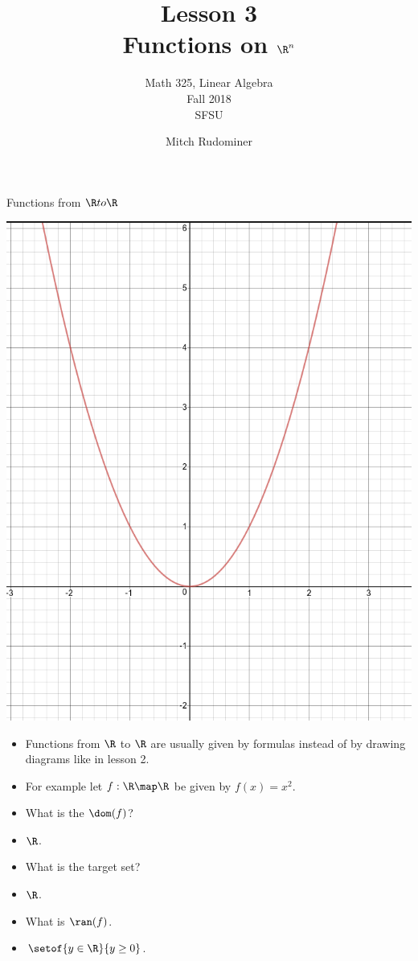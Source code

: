 \documentclass{beamer}
\title{Lesson 3 \\ Functions on $\R^n$}
\subtitle{Math 325, Linear Algebra \\ Fall 2018 \\ SFSU}
\author{Mitch Rudominer}
\date{}
\begin{document}
\begin{frame}
  \titlepage
\end{frame}


\beamerdefaultoverlayspecification{<+->}

\begin{frame}{Functions from $\R to \R$}

\includegraphics[scale=0.1]{parabola}

\begin{itemize}
\item Functions from $\R$ to $\R$ are usually given by formulas instead of
by drawing diagrams like in lesson 2.
\item For example let $f:\R\map\R$ be given by $f(x) = x^2$.
\item What is the $\dom(f)$?
\item $\R$.
\item What is the target set?
\item $\R$.
\item What is $\ran(f)$.
\item $\setof{y\in\R}{y\geq 0}$.
\end{itemize}

\end{frame}
\end{document}

